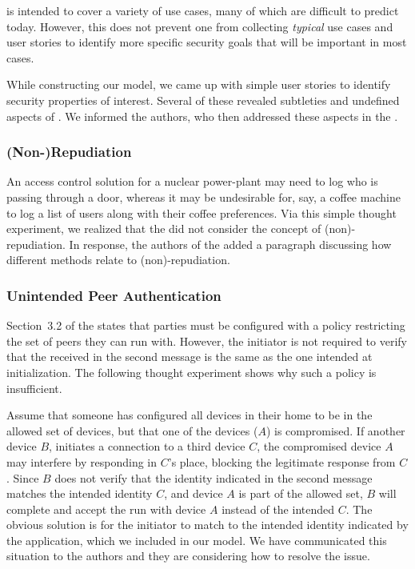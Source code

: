 \documentclass[a4paper,twoside,draft]{article}
\begin{document}
\mEdhoc{} is intended to cover a variety of use cases, many of which are
difficult to predict today.
%
However, this does not
prevent one from collecting \emph{typical} use cases and user stories
to identify more specific security goals that will be important in most cases.
%

While constructing our model, we came up with simple user stories to identify
security properties of interest.
%
Several of these revealed subtleties and undefined aspects of \mEdhoc{}.
%
We informed the \mEdhoc{} authors, who then addressed these aspects in the
\mSpec{}.
%

\subsubsection{(Non-)Repudiation}
An access control solution for a nuclear power-plant may need to log who is
passing through a door, whereas it may be undesirable for, say, a coffee
machine to log a list of users along with their coffee preferences.
%
Via this simple thought experiment, we realized that the \mSpec{} did not
consider the concept of (non)-repudiation.
%
In response, the authors of the \mSpec{} added a paragraph discussing how
different methods relate to (non)-repudiation.

\subsubsection{Unintended Peer Authentication}
Section~3.2 of the \mSpec{} states that parties must be configured
with a policy restricting the set of peers they can run \mEdhoc{} with.
%
However, the initiator is not required to verify that the \mIdcredr{} received
in the second message is the same as the one intended at initialization.
%
The following thought experiment shows why such a policy is insufficient.
%

Assume that someone has configured all devices in their home to be in the
allowed set of devices, but that one of the devices ($A$) is compromised.
%
If another device $B$, initiates a connection to a third device $C$, the
compromised device $A$ may interfere by responding in $C$'s place, blocking
the legitimate response from $C$.
%
Since $B$ does not verify that the identity indicated in the second message
matches the intended identity $C$, and device $A$ is part of the allowed set,
$B$ will complete and accept the \mEdhoc{} run with device $A$ instead of the
intended $C$.
%
The obvious solution is for the initiator to match \mIdcredr{} to the intended
identity indicated by the application, which we included in our model.
%
We have communicated this situation to the \mEdhoc{} authors and they are considering
how to resolve the issue.
%
\end{document}
